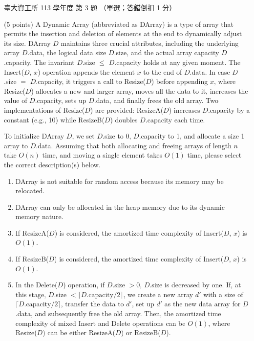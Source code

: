 \begin{pastexam}[label={px:ntu-113-dsa-03}]{臺大資工所 113 學年度 第 3 題}
（單選；答錯倒扣 1 分）

(5 points) A Dynamic Array (abbreviated as DArray) is a type of array that permits the insertion and
deletion of elements at the end to dynamically adjust its size. DArray $D$ maintains three crucial
attributes, including the underlying array $D$.data, the logical data size $D$.size, and the actual
array capacity $D$.capacity. The invariant $D$.size $\le$ $D$.capacity holds at any given moment.
The Insert($D$, $x$) operation appends the element $x$ to the end of $D$.data. In case $D$.size $=$
$D$.capacity, it triggers a call to Resize($D$) before appending $x$, where Resize($D$) allocates a
new and larger array, moves all the data to it, increases the value of $D$.capacity, sets up
$D$.data, and finally frees the old array. Two implementations of Resize($D$) are provided:
ResizeA($D$) increases $D$.capacity by a constant (e.g., 10) while ResizeB($D$) doubles
$D$.capacity each time.

To initialize DArray $D$, we set $D$.size to 0, $D$.capacity to 1, and allocate a size 1 array to
$D$.data. Assuming that both allocating and freeing arrays of length $n$ take $O(n)$ time, and moving
a single element takes $O(1)$ time, please select the correct description(s) below.
\begin{enumerate}[label=\Alph*.]
\item DArray is not suitable for random access because its memory may be relocated.
\item DArray can only be allocated in the heap memory due to its dynamic memory nature.
\item If ResizeA($D$) is considered, the amortized time complexity of Insert($D$, $x$) is $O(1)$.
\item If ResizeB($D$) is considered, the amortized time complexity of Insert($D$, $x$) is $O(1)$.
\item In the Delete($D$) operation, if $D$.size $>0$, $D$.size is decreased by one. If, at this
stage, $D$.size $<\lceil D.\text{capacity}/2\rceil$, we create a new array $d'$ with a size of
$\lceil D.\text{capacity}/2\rceil$, transfer the data to $d'$, set up $d'$ as the new data array for
$D$.data, and subsequently free the old array. Then, the amortized time complexity of mixed Insert
and Delete operations can be $O(1)$, where Resize($D$) can be either ResizeA($D$) or ResizeB($D$).
\end{enumerate}
\end{pastexam}

